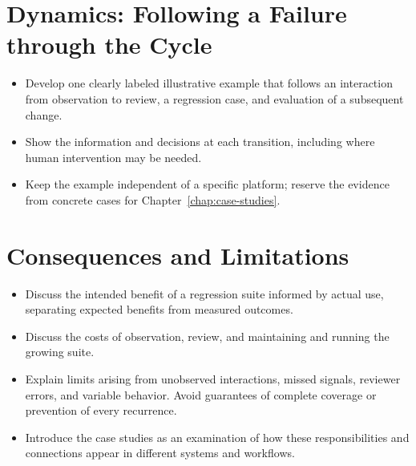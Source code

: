 \section{Dynamics: Following a Failure through the Cycle}
\label{sec:cd4ai-dynamics}

\begin{itemize}
  \item Develop one clearly labeled illustrative example that follows an
    interaction from observation to review, a regression case, and evaluation
    of a subsequent change.
  \item Show the information and decisions at each transition, including where
    human intervention may be needed.
  \item Keep the example independent of a specific platform; reserve the
    evidence from concrete cases for Chapter~\ref{chap:case-studies}.
\end{itemize}

\section{Consequences and Limitations}
\label{sec:cd4ai-consequences}

\begin{itemize}
  \item Discuss the intended benefit of a regression suite informed by actual
    use, separating expected benefits from measured outcomes.
  \item Discuss the costs of observation, review, and maintaining and running
    the growing suite.
  \item Explain limits arising from unobserved interactions, missed signals,
    reviewer errors, and variable behavior. Avoid guarantees of complete
    coverage or prevention of every recurrence.
  \item Introduce the case studies as an examination of how these responsibilities
    and connections appear in different systems and workflows.
\end{itemize}
